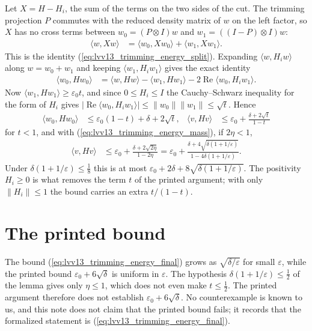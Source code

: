 \documentclass{article}
\begin{document}
Let $X=H-H_i$, the sum of the terms on the two sides of the cut. The
trimming projection $P$ commutes with the reduced density matrix of $w$ on
the left factor, so $X$ has no cross terms between $w_0=(P\otimes I)w$ and
$w_1=((I-P)\otimes I)w$:
\begin{align}
    \langle w,Xw\rangle & =\langle w_0,Xw_0\rangle+\langle w_1,Xw_1\rangle.
    \label{eq:lvv13_trimming_energy_no_cross}
\end{align}
This is the identity (\ref{eq:lvv13_trimming_energy_split}). Expanding
$\langle w,H_iw\rangle$ along $w=w_0+w_1$ and keeping
$\langle w_1,H_iw_1\rangle$ gives the exact identity
\begin{align}
    \langle w_0,Hw_0\rangle & =\langle w,Hw\rangle-\langle w_1,Hw_1\rangle
    -2\operatorname{Re}\langle w_0,H_iw_1\rangle.
    \label{eq:lvv13_trimming_energy_identity}
\end{align}
Now $\langle w_1,Hw_1\rangle\ge\varepsilon_0t$, and since $0\le H_i\le I$
the Cauchy--Schwarz inequality for the form of $H_i$ gives
$|\operatorname{Re}\langle w_0,H_iw_1\rangle|\le\|w_0\|\|w_1\|\le\sqrt t$.
Hence
\begin{align}
    \langle w_0,Hw_0\rangle & \le\varepsilon_0(1-t)+\delta+2\sqrt t,
     & \langle v,Hv\rangle & \le\varepsilon_0+\frac{\delta+2\sqrt t}{1-t}
    \label{eq:lvv13_trimming_energy_corrected}
\end{align}
for $t<1$, and with (\ref{eq:lvv13_trimming_energy_mass}), if $2\eta<1$,
\begin{align}
    \langle v,Hv\rangle & \le\varepsilon_0
    +\frac{\delta+2\sqrt{2\eta}}{1-2\eta}
    =\varepsilon_0+\frac{\delta+4\sqrt{\delta(1+1/\varepsilon)}}
    {1-4\delta(1+1/\varepsilon)}.
    \label{eq:lvv13_trimming_energy_final}
\end{align}
Under $\delta(1+1/\varepsilon)\le\frac18$ this is at most
$\varepsilon_0+2\delta+8\sqrt{\delta(1+1/\varepsilon)}$. The positivity
$H_i\ge0$ is what removes the term $t$ of the printed argument; with only
$\|H_i\|\le1$ the bound carries an extra $t/(1-t)$.

\section{The printed bound}

The bound (\ref{eq:lvv13_trimming_energy_final}) grows as
$\sqrt{\delta/\varepsilon}$ for small $\varepsilon$, while the printed bound
$\varepsilon_0+6\sqrt\delta$ is uniform in $\varepsilon$. The hypothesis
$\delta(1+1/\varepsilon)\le\frac12$ of the lemma gives only $\eta\le1$, which
does not even make $t\le\frac12$. The printed argument therefore does not
establish $\varepsilon_0+6\sqrt\delta$. No counterexample is known to us,
and this note does not claim that the printed bound fails; it records that
the formalized statement is (\ref{eq:lvv13_trimming_energy_final}).
\end{document}

